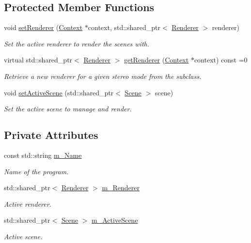\subsection*{Protected Member Functions}
\begin{DoxyCompactItemize}
\item 
void \hyperlink{class_program_ad76eb179a68360571ea857f5ce7ce126}{set\+Renderer} (\hyperlink{class_context}{Context} $\ast$context, std\+::shared\+\_\+ptr$<$ \hyperlink{class_renderer}{Renderer} $>$ renderer)
\begin{DoxyCompactList}\small\item\em Set the active renderer to render the scenes with. \end{DoxyCompactList}\item 
virtual std\+::shared\+\_\+ptr$<$ \hyperlink{class_renderer}{Renderer} $>$ \hyperlink{class_program_a016ef26d3d6b6aeffd3b4e74dfde033e}{get\+Renderer} (\hyperlink{class_context}{Context} $\ast$context) const  =0
\begin{DoxyCompactList}\small\item\em Retrieve a new renderer for a given stereo mode from the subclass. \end{DoxyCompactList}\item 
void \hyperlink{class_program_a0bfe1a80dedb4bfaddfc6ab364c4e62a}{set\+Active\+Scene} (std\+::shared\+\_\+ptr$<$ \hyperlink{class_scene}{Scene} $>$ scene)
\begin{DoxyCompactList}\small\item\em Set the active scene to manage and render. \end{DoxyCompactList}\end{DoxyCompactItemize}
\subsection*{Private Attributes}
\begin{DoxyCompactItemize}
\item 
const std\+::string \hyperlink{class_program_a69d3c5c15cf8167d59e4d8c25e915063}{m\+\_\+\+Name}
\begin{DoxyCompactList}\small\item\em Name of the program. \end{DoxyCompactList}\item 
std\+::shared\+\_\+ptr$<$ \hyperlink{class_renderer}{Renderer} $>$ \hyperlink{class_program_a0aaeb79e919a8009806510e5dca10f50}{m\+\_\+\+Renderer}
\begin{DoxyCompactList}\small\item\em Active renderer. \end{DoxyCompactList}\item 
std\+::shared\+\_\+ptr$<$ \hyperlink{class_scene}{Scene} $>$ \hyperlink{class_program_a261d54bdb11938ff460af06232f8580f}{m\+\_\+\+Active\+Scene}
\begin{DoxyCompactList}\small\item\em Active scene. \end{DoxyCompactList}\end{DoxyCompactItemize}


